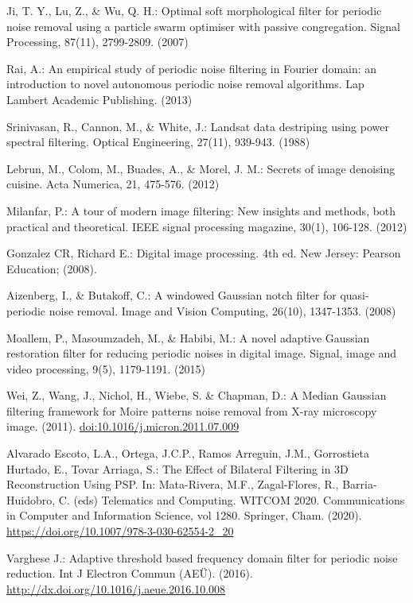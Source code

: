 \documentclass[10pt,letterpaper]{article}
\begin{document}
\begin{thebibliography}{0}
Ji, T. Y., Lu, Z., \& Wu, Q. H.:  Optimal soft morphological filter for periodic noise removal using a particle swarm optimiser with passive congregation. Signal Processing, 87(11), 2799-2809. (2007)

Rai, A.: An empirical study of periodic noise filtering in Fourier domain: an introduction to novel autonomous periodic noise removal algorithms. Lap Lambert Academic Publishing. (2013)

Srinivasan, R., Cannon, M., \& White, J.: Landsat data destriping using power spectral filtering. Optical Engineering, 27(11), 939-943. (1988)

Lebrun, M., Colom, M., Buades, A., \& Morel, J. M.: Secrets of image denoising cuisine. Acta Numerica, 21, 475-576. (2012)

Milanfar, P.: A tour of modern image filtering: New insights and methods, both practical and theoretical. IEEE signal processing magazine, 30(1), 106-128. (2012)

Gonzalez CR, Richard E.: Digital image processing. 4th ed. New Jersey: Pearson Education; (2008).

Aizenberg, I., \& Butakoff, C.: A windowed Gaussian notch filter for quasi-periodic noise removal. Image and Vision Computing, 26(10), 1347-1353. (2008)

Moallem, P., Masoumzadeh, M., \& Habibi, M.: A novel adaptive Gaussian restoration filter for reducing periodic noises in digital image. Signal, image and video processing, 9(5), 1179-1191. (2015)

Wei, Z., Wang, J., Nichol, H., Wiebe, S. \& Chapman, D.: A Median Gaussian filtering framework for Moire patterns noise removal from X-ray microscopy image. (2011). \url{doi:10.1016/j.micron.2011.07.009}

Alvarado Escoto, L.A., Ortega, J.C.P., Ramos Arreguin, J.M., Gorrostieta Hurtado, E., Tovar Arriaga, S.: The Effect of Bilateral Filtering in 3D Reconstruction Using PSP. In: Mata-Rivera, M.F., Zagal-Flores, R., Barria-Huidobro, C. (eds) Telematics and Computing. WITCOM 2020. Communications in Computer and Information Science, vol 1280. Springer, Cham. (2020). \url{https://doi.org/10.1007/978-3-030-62554-2\_20}

Varghese J.: Adaptive threshold based frequency domain filter for periodic noise reduction. Int J Electron Commun (AEÜ). (2016). \url{http://dx.doi.org/10.1016/j.aeue.2016.10.008}


\end{thebibliography}
\end{document}
